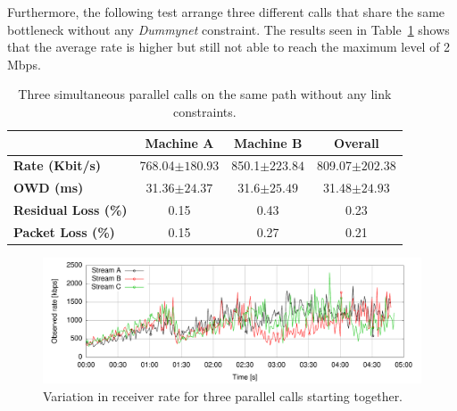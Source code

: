 Furthermore, the following test arrange three different calls that share the same bottleneck without any {\it Dummynet} constraint. The results seen in Table~\ref{fig:three_no_dummynet_sync} shows that the average rate is higher but still not able to reach the maximum level of 2 Mbps. 

\begin{table}[h]
\begin{center}
	\begin{tabular}{| l | c | c | c |}
	\hline
    	 & Machine A & Machine B & Overall \\ \hline
	\textbf{Rate (Kbit/s)} & 768.04$\pm180.93$ & 850.1$\pm223.84$ & 809.07$\pm202.38$\\\hline
	\textbf{OWD (ms)} & 31.36$\pm24.37$ & 31.6$\pm25.49$ & 31.48$\pm24.93$\\\hline
	\textbf{Residual Loss (\%)} & 0.15 & 0.43 & 0.23\\\hline
	\textbf{Packet Loss (\%)} & 0.15 & 0.27 & 0.21\\\hline
	\end{tabular}
    \caption[Three simultaneous parallel calls on the same path without any link constraints]{Three simultaneous parallel calls on the same path without any link constraints.}
    \label{fig:three_no_dummynet_sync}
\end{center}
\end{table}

\begin{figure}[h]
  \centering
    \includegraphics[width=1\textwidth]{./figures/sync_three-calls.pdf}
      \caption[Variation in receiver rate for three parallel calls starting together]{Variation in receiver rate for three parallel calls starting together.}
	\label{fig:three_parallel}
\end{figure}

